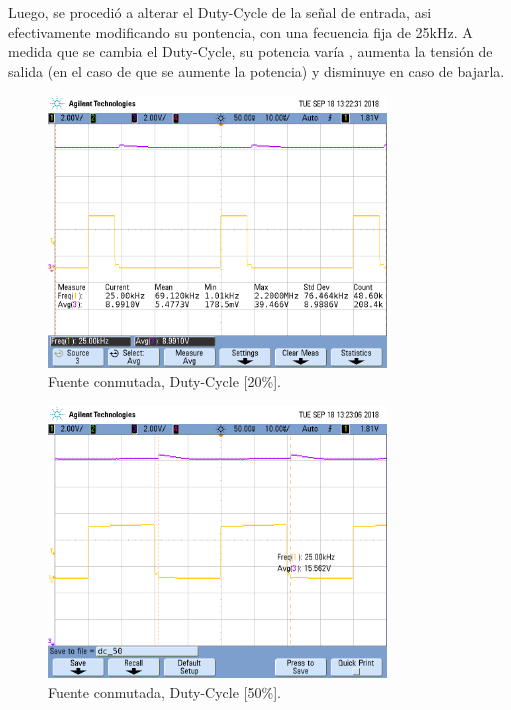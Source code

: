 Luego, se procedió a alterar el Duty-Cycle de la señal de entrada, asi efectivamente modificando su pontencia, con una fecuencia fija de 25kHz.
A medida que se cambia el Duty-Cycle, su potencia varía , aumenta la tensión de salida  (en el caso de que se aumente la potencia) y disminuye en caso de bajarla.
\begin{figure}[H]
	\centering
	\includegraphics[width=0.8\textwidth]{Imagenes/dc_20.png}
\caption{Fuente conmutada, Duty-Cycle [20\%].}
	\label{fig:fcon20}
\end{figure}
\begin{figure}[H]
	\centering
	\includegraphics[width=0.8\textwidth]{Imagenes/dc_50.png}
\caption{Fuente conmutada, Duty-Cycle [50\%].}
	\label{fig:fcon50}
\end{figure} 
